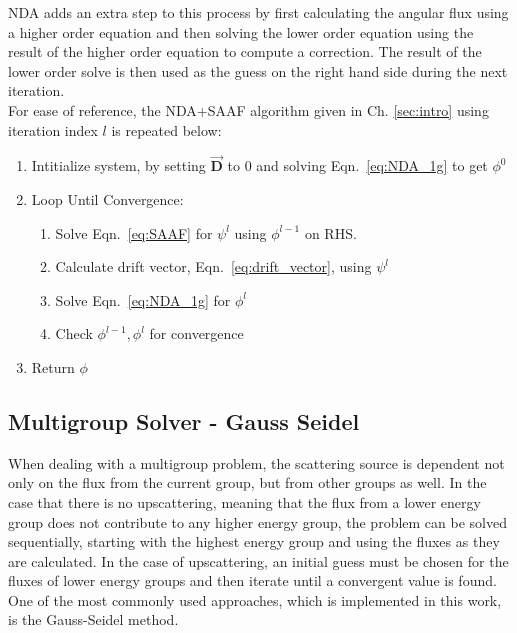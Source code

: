 NDA adds an extra step to this process by first calculating the angular flux using a higher order equation and then solving the lower order equation using the result of the higher order equation to compute a correction. The result of the lower order solve is then used as the guess on the right hand side during the next iteration. \\
For ease of reference, the NDA+SAAF algorithm given in Ch. \ref{sec:intro} using iteration index $l$ is repeated below: 

\begin{enumerate}
    \item Intitialize system, by setting $\vec{\textbf{D}}$ to 0 and solving Eqn.~\eqref{eq:NDA_1g} to get $\phi^0$ 
    \item Loop Until Convergence:
        \begin{enumerate}
            \item Solve Eqn.~\eqref{eq:SAAF} for $\psi^l$ using $\phi^{l-1}$ on RHS.
            \item Calculate drift vector, Eqn.~\eqref{eq:drift_vector}, using $\psi^l$
            \item Solve Eqn.~\eqref{eq:NDA_1g} for $\phi^l$
            \item Check $\phi^{l-1}, \phi^l$ for convergence
        \end{enumerate}
    \item Return $\phi$
\end{enumerate}

\subsection{Multigroup Solver - Gauss Seidel}
When dealing with a multigroup problem, the scattering source is dependent not only on the flux from the current group, but from other groups as well. In the case that there is no upscattering, meaning that the flux from a lower energy group does not contribute to any higher energy group, the problem can be solved sequentially, starting with the highest energy group and using the fluxes as they are calculated. In the case of upscattering, an initial guess must be chosen for the fluxes of lower energy groups and then iterate until a convergent value is found. One of the most commonly used approaches, which is implemented in this work, is the Gauss-Seidel method.

